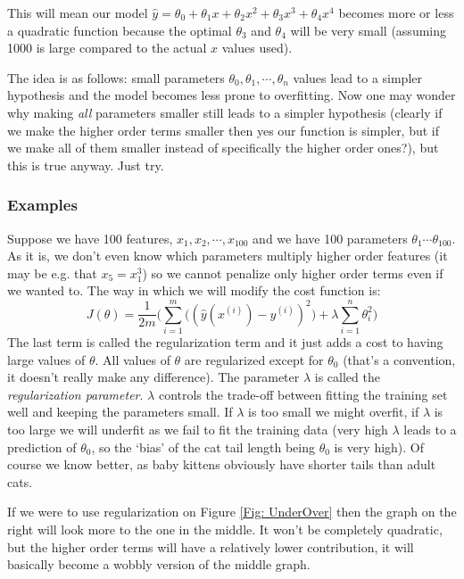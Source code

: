 \documentclass[a4paper, 10pt,hidelinks]{article}
\newcommand{\ind}[1]{^{(#1)}}
\begin{document}
This will mean our model $\hat{y} = \theta_0 + \theta_1 x + \theta_2 x^2 + \theta_3 x^3 + \theta_4 x^4$ becomes more or less a quadratic function because the optimal $\theta_3$ and $\theta_4$ will be very small (assuming 1000 is large compared to the actual $x$ values used). 

The idea is as follows: small parameters $\theta_0, \theta_1, \cdots, \theta_n$ values lead to a simpler hypothesis and the model becomes less prone to overfitting. Now one may wonder why making \emph{all} parameters smaller still leads to a simpler hypothesis (clearly if we make the higher order terms smaller then yes our function is simpler, but if we make all of them smaller instead of specifically the higher order ones?), but this is true anyway. Just try. 

\subsubsection{Examples}
Suppose we have 100 features, $x_1, x_2, \cdots, x_{100}$ and we have 100 parameters $\theta_1 \cdots \theta_{100}$. As it is, we don't even know which parameters multiply higher order features (it may be e.g. that $x_5 = x_1^3$) so we cannot penalize only higher order terms even if we wanted to. The way in which we will modify the cost function is:
\begin{equation}\label{Eq: Regularized linear regression}
J(\theta) = \frac{1}{2m} \Bigg( \sum_{i = 1}^m \Big( (\hat{y}(x\ind{i}) - y\ind{i})^2\Big) + \lambda \sum_{i = 1}^n \theta_i^2 \Bigg)
\end{equation}
The last term is called the regularization term and it just adds a cost to having large values of $\theta$. All values of $\theta$ are regularized except for $\theta_0$ (that's a convention, it doesn't really make any difference). The parameter $\lambda$ is called the \emph{regularization parameter}. $\lambda$ controls the trade-off between fitting the training set well and keeping the parameters small. If $\lambda$ is too small we might overfit, if $\lambda$ is too large we will underfit as we fail to fit the training data (very high $\lambda$ leads to a prediction of $\theta_0$, so the `bias' of the cat tail length being $\theta_0$ is very high). Of course we know better, as baby kittens obviously have shorter tails than adult cats. 

If we were to use regularization on Figure \ref{Fig: UnderOver} then the graph on the right will look more to the one in the middle. It won't be completely quadratic, but the higher order terms will have a relatively lower contribution, it will basically become a wobbly version of the middle graph. 
\end{document}

